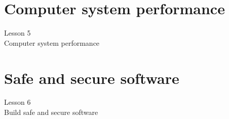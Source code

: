 \documentclass[aspectratio=1610]{beamer}
\begin{document}


\section{Computer system performance}
\begin{frame}
\begin{center}
\Huge Lesson 5\\
Computer system performance
\end{center}
\end{frame}



\section{Safe and secure software}
\begin{frame}
\begin{center}
\Huge Lesson 6\\
Build safe and secure software
\end{center}
\end{frame}
\end{document}
